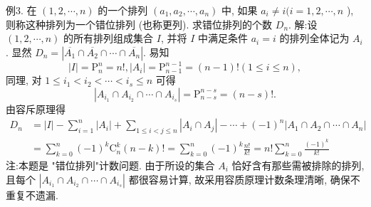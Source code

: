 例3. 在 $(1,2, \cdots, n)$ 的一个排列 $\left(a_1, a_2, \cdots, a_n\right)$ 中, 如果 $a_i \neq i(i= 1,2, \cdots, n$ ), 则称这种排列为一个错位排列 (也称更列). 求错位排列的个数 $D_n$.
解:设 $(1,2, \cdots, n)$ 的所有排列组成集合 $I$, 并将 $I$ 中满足条件 $a_i=i$ 的排列全体记为 $A_i$. 显然 $D_n=\left|\overline{A_1} \cap \overline{A_2} \cap \cdots \cap \overline{A_n}\right|$. 易知
$$
|I|=\mathrm{P}_n^n=n !,\left|A_i\right|=\mathrm{P}_{n-1}^{n-1}=(n-1) !(1 \leqslant i \leqslant n),
$$
同理, 对 $1 \leqslant i_1<i_2<\cdots<i_s \leqslant n$ 可得
$$
\left|A_{i_1} \cap A_{i_2} \cap \cdots \cap A_{i_s}\right|=\mathrm{P}_{n-s}^{n-s}=(n-s) ! .
$$
由容斥原理得
$$
\begin{aligned}
D_n & =|I|-\sum_{i=1}^n\left|A_i\right|+\sum_{1 \leqslant i<j \leqslant n}\left|A_i \cap A_j\right|-\cdots+(-1)^n\left|A_1 \cap A_2 \cap \cdots \cap A_n\right| \\
& =\sum_{k=0}^n(-1)^k \mathrm{C}_n^k(n-k) !=\sum_{k=0}^n(-1)^k \frac{n !}{k !}=n ! \sum_{k=0}^n \frac{(-1)^k}{k !}
\end{aligned}
$$
注:本题是 "错位排列"计数问题.
由于所设的集合 $A_i$ 恰好含有那些需被排除的排列, 且每个 $\left|A_{i_1} \cap A_{i_2} \cap \cdots \cap A_{i_s}\right|$ 都很容易计算, 故采用容质原理计数条理清晰, 确保不重复不遗漏.



